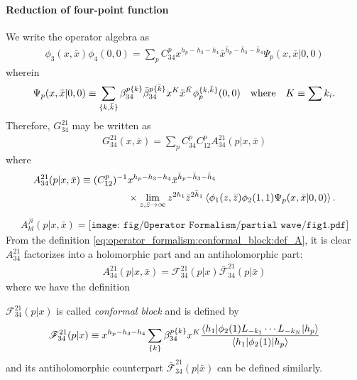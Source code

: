 \documentclass[10pt]{article}
\begin{document}
\paragraph{Reduction of four-point function}
We write the operator algebra as
\begin{align}
    \phi_3(x,\bar{x})\phi_4(0,0)=\sum_p C^{p}_{34}x^{h_p-h_3-h_4}\bar{x}^{\bar{h}_p-\bar{h}_3-\bar{h}_4}\Psi_p(x,\bar{x}|0,0)
\end{align}
wherein 
\begin{align}
    \Psi_p(x,\bar{x}|0,0)\equiv\sum_{\{k,\bar{k}\}}\beta^{p\{k\}}_{34}\bar{\beta}^{p\{\bar{k}\}}_{34}x^K \bar{x}^{\bar{K}}\phi_p^{\{k,\bar{k}\}}(0,0)\qq{where} K\equiv\sum k_i.
\end{align}
Therefore, $G^{21}_{34}$ may be written as 
\begin{align}
    G^{21}_{34}(x,\bar{x})=\sum_p C^p_{34} C^p_{12} A^{21}_{34}(p|x,\bar{x})
\end{align}
where 
\begin{align}\label{eq:operator_formalism:conformal_block:def_A}
    A^{21}_{34}(p|x,\bar{x})\equiv(C^p_{12})^{-1}&x^{h_p-h_3-h_4}\bar{x}^{\bar{h}_p-\bar{h}_3-\bar{h}_4}\notag\\
                                                 &\times\lim_{z,\bar{z}\to\infty}z^{2h_1}\bar{z}^{2\bar{h}_1}\expval{\phi_1(z,\bar{z})\phi_2(1,1)\Psi_p(x,\bar{x}|0,0)}.
\end{align}
\begin{align}
    A^{ji}_{kl}(p|x,\bar{x})=\texttt{[image: fig/Operator Formalism/partial wave/fig1.pdf]}
\end{align}
From the definition \cref{eq:operator_formalism:conformal_block:def_A}, it is clear $A^{21}_{34}$ factorizes into a holomorphic part and an antiholomorphic part:
\begin{align}
    A^{21}_{34}(p|x,\bar{x})=\mathscr{F}^{21}_{34}(p|x)\bar{\mathscr{F}}^{21}_{34}(p|\bar{x})
\end{align}
where we have the definition  
\begin{definition}
    $\mathscr{F}^{21}_{34}(p|x)$ is called \textit{conformal block} and is defined by
    \begin{align}
        \mathscr{F}^{21}_{34}(p|x)\equiv x^{h_p-h_3-h_4}\sum_{\{k\}}\beta^{p\{k\}}_{34}x^K\frac{\mel**{h_1}{\phi_2(1)L_{-k_1}\cdots L_{-k_N}}{h_p}}{\mel**{h_1}{\phi_2(1)}{h_p}}
    \end{align}
    and its antiholomorphic counterpart $\bar{\mathscr{F}}^{21}_{34}(p|\bar{x})$ can be defined similarly.
\end{definition}
\end{document}
